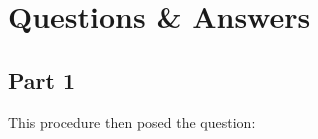 
\section{Questions \& Answers}\label{sec:qa}

    \subsection{Part 1}\label{subsec:part1_qa}
        \lipsum[1]

        \medskip
        \noindent This procedure then posed the question:

